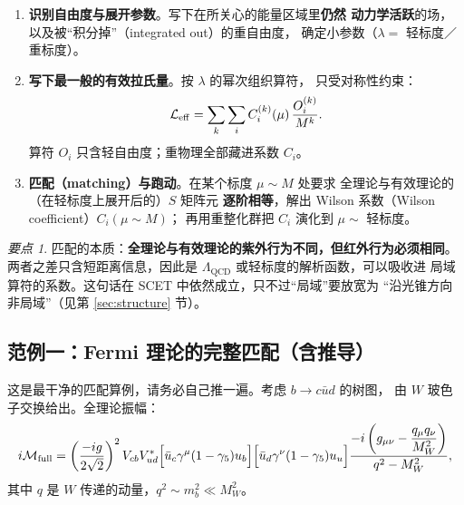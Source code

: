 \documentclass[UTF8,a4paper,11pt]{ctexart}
\theoremstyle{definition}
\theoremstyle{remark}
\newtheorem{keypoint}{要点}[section]
\theoremstyle{plain}
\newcommand{\LQCD}{\Lambda_{\mathrm{QCD}}}
\newcommand{\en}[1]{\textsf{#1}}   %
\begin{document}
\begin{enumerate}[label=\textbf{第 \arabic* 步}, leftmargin=2.1cm]
  \item \textbf{识别自由度与展开参数}。写下在所关心的能量区域里\textbf{仍然
        动力学活跃}的场，以及被“积分掉”（\en{integrated out}）的重自由度，
        确定小参数（$\lambda=$ 轻标度／重标度）。
  \item \textbf{写下最一般的有效拉氏量}。按 $\lambda$ 的幂次组织算符，
        只受对称性约束：
        \begin{equation}
          \mathcal L_{\rm eff}=\sum_{k}\sum_{i} C_i^{(k)}(\mu)\,
          \frac{O_i^{(k)}}{M^{k}} .
          \label{eq:leff}
        \end{equation}
        算符 $O_i$ 只含轻自由度；重物理全部藏进系数 $C_i$。
  \item \textbf{匹配（\en{matching}）与跑动}。在某个标度 $\mu\sim M$ 处要求
        全理论与有效理论的（在轻标度上展开后的）$S$ 矩阵元
        \textbf{逐阶相等}，解出 Wilson 系数（\en{Wilson coefficient}）$C_i(\mu\sim M)$；
        再用重整化群把 $C_i$ 演化到 $\mu\sim$ 轻标度。
\end{enumerate}

\begin{keypoint}
匹配的本质：\textbf{全理论与有效理论的紫外行为不同，但红外行为必须相同}。
两者之差只含短距离信息，因此是 $\LQCD$ 或轻标度的解析函数，可以吸收进
局域算符的系数。这句话在 SCET 中依然成立，只不过“局域”要放宽为
“沿光锥方向非局域”（见第 \ref{sec:structure} 节）。
\end{keypoint}

\subsection{范例一：Fermi 理论的完整匹配（含推导）}
\label{subsec:fermi}

这是最干净的匹配算例，请务必自己推一遍。考虑 $b\to c\bar u d$ 的树图，
由 $W$ 玻色子交换给出。全理论振幅：
\begin{equation}
  i\mathcal M_{\rm full}
  =\left(\frac{-ig}{2\sqrt2}\right)^2 V_{cb}V_{ud}^*
  \Big[\bar u_c\gamma^\mu(1-\gamma_5)u_b\Big]
  \Big[\bar u_d\gamma^\nu(1-\gamma_5)u_u\Big]
  \frac{-i\left(g_{\mu\nu}-\dfrac{q_\mu q_\nu}{M_W^2}\right)}{q^2-M_W^2} ,
  \label{eq:fullamp}
\end{equation}
其中 $q$ 是 $W$ 传递的动量，$q^2\sim m_b^2\ll M_W^2$。
\end{document}
